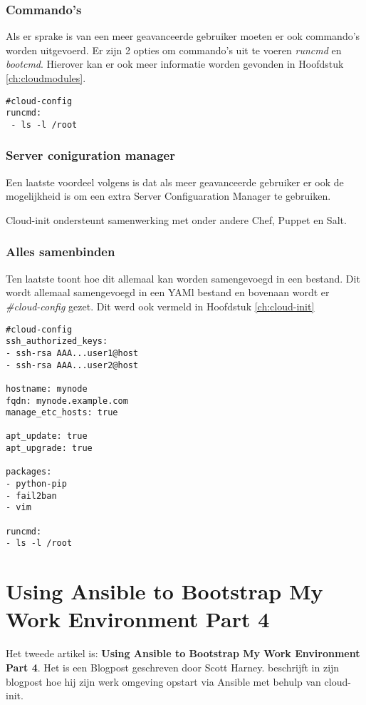 \subsubsection{Commando's}
Als er sprake is van een meer geavanceerde gebruiker moeten er ook commando's worden uitgevoerd. Er zijn 2 opties om commando's uit te voeren \textit{runcmd} en \textit{bootcmd}. Hierover kan er ook meer informatie worden gevonden in Hoofdstuk \ref*{ch:cloudmodules}.
\begin{lstlisting}
#cloud-config
runcmd:
 - ls -l /root
\end{lstlisting} 
\subsubsection{Server coniguration manager}
Een laatste voordeel volgens \autocite{viktorpet} is dat als meer geavanceerde gebruiker er ook de mogelijkheid is om een extra Server Configuaration Manager te gebruiken. 

Cloud-init ondersteunt samenwerking met onder andere Chef, Puppet en Salt.
\subsubsection{Alles samenbinden}
Ten laatste toont \autocite{viktorpet} hoe dit allemaal kan worden samengevoegd in een bestand. Dit wordt allemaal samengevoegd in een YAMl bestand en bovenaan wordt er \textit{\#cloud-config} gezet. Dit werd ook vermeld in Hoofdstuk \ref*{ch:cloud-init}
\begin{lstlisting}
#cloud-config
ssh_authorized_keys:
- ssh-rsa AAA...user1@host
- ssh-rsa AAA...user2@host

hostname: mynode
fqdn: mynode.example.com
manage_etc_hosts: true

apt_update: true
apt_upgrade: true

packages:
- python-pip
- fail2ban
- vim

runcmd:
- ls -l /root
\end{lstlisting} 

\newpage

\section{Using Ansible to Bootstrap My Work Environment Part 4}
Het tweede artikel is: \textbf{Using Ansible to Bootstrap My Work Environment Part 4}. Het is een Blogpost geschreven door Scott Harney. \autocite{scottharney} beschrijft in zijn blogpost hoe hij zijn werk omgeving opstart via Ansible met behulp van cloud-init. 

